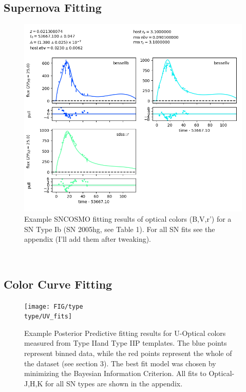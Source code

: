 %
\subsection{Supernova Fitting}
\begin{figure}[H]
\centering
\includegraphics[scale=.75,center]{FIG/fits/lc_2005hg}
\caption{\label{fig:FIG/typeIb/J_fits} Example SNCOSMO fitting results of optical colors (B,V,r') for a SN Type Ib (SN 2005hg, see Table 1). For all SN fits see the appendix (I'll add them after tweaking).}
\end{figure}

\

\subsection{Color Curve Fitting}
\newcommand{\type}{II}
\begin{figure}[H]
\centering
\texttt{[image: FIG/type\\type/UV\_fits]}
\caption{\label{fig:FIG/typeIb/J_fits} Example Posterior Predictive fitting results for U-Optical colors measured from Type \type and Type IIP templates. The blue points represent binned data, while the red points represent the whole of the dataset (see section 3). The best fit model was chosen by minimizing the Bayesian Information Criterion. All fits to Optical-J,H,K for all SN types are shown in the appendix.}
\end{figure}

